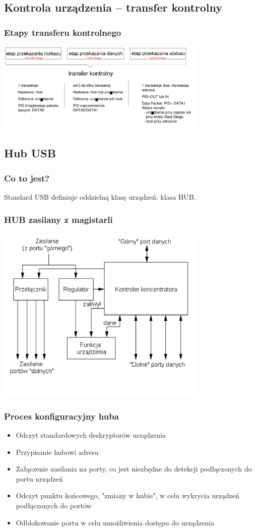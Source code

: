 \subsection{Kontrola urządzenia – transfer kontrolny}
	\subsubsection{Etapy transferu kontrolnego}
	\includegraphics[width=10cm]{./wyklady/USB_31_1.pdf}
	
\subsection{Hub USB}
	\subsubsection{Co to jest?}
	Standard USB definiuje oddzielną klasę urządzeń: klasa HUB.
	\subsubsection{HUB zasilany z magistarli}
	\includegraphics[width=10cm]{./wyklady/USB_34_1.pdf}
	\subsubsection{Proces konfiguracyjny huba}
	\begin{itemize}
		\item Odczyt standardowych deskryptorów urządzenia
		\item Przypisanie hubowi adresu
		\item Załączenie zasilania na porty, co jest niezbędne do detekcji podłączonych do portu urządzeń
		\item Odczyt punktu końcowego, "zmiany w hubie", w celu wykrycia urządzeń podłączonych do portów
		\item Odblokowanie portu w celu umożliwienia dostępu do urządzenia
	\end{itemize}
